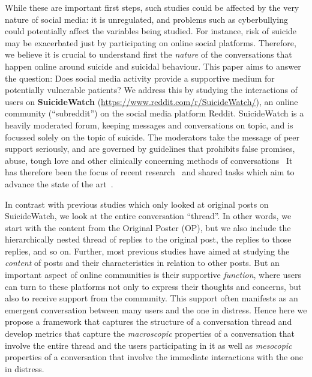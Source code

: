 While these are important first steps, such studies 
could be affected by the very nature of social media: it is unregulated, and problems such as cyberbullying\cite{luxton2012social,patton2014social} could potentially affect the variables being studied.  For instance, risk of suicide may be exacerbated just by participating on online social platforms. Therefore, we believe it is crucial to understand first the \emph{nature} of the conversations that happen online around suicide and suicidal behaviour. This paper aims to answer the question:  Does social media activity provide a supportive medium for potentially vulnerable patients? We address this  by studying the interactions of users on  \textbf{SuicideWatch} (\url{https://www.reddit.com/r/SuicideWatch/}), an online community (``subreddit'') on the social media platform Reddit. SuicideWatch is a heavily moderated forum, keeping messages and conversations on topic, and is  focussed solely on the topic of suicide. 
The moderators take the message of peer support seriously, and are governed by guidelines that prohibits false promises, abuse, tough love and other clinically concerning methods of conversations~\cite{BBC_suicidewatch}
It has therefore been the focus of recent research~\cite{shing2018} and shared tasks which aim to advance the state of the art~\cite{clpsych}. 

In contrast with previous studies which only looked at original posts on SuicideWatch, we look at the entire conversation ``thread''. In other words, we start with the content from the Original Poster (OP), but we also include the hierarchically nested thread of replies to the original post, the replies to those replies, and so on.
%
Further, most previous studies have aimed at studying the \emph{content} of posts and their characteristics in relation to other posts. But an important aspect of online communities is their supportive \emph{function}, where users can turn to these platforms not only to express their thoughts and concerns, but also to receive support from the community. This support often manifests as an emergent conversation between many users and the one in distress. Hence here we propose a framework that captures the structure of a conversation thread and develop metrics that capture the \emph{macroscopic} properties of a conversation that involve the entire thread and the users participating in it as well as \emph{mesocopic} properties of a conversation that involve the immediate interactions with the one in distress. 


